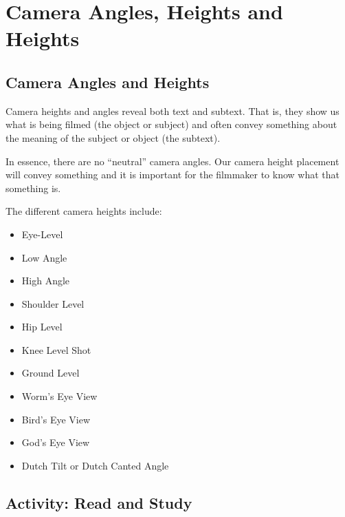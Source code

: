 \documentclass[
]{book}
\providecommand{\tightlist}{%
  \setlength{\itemsep}{0pt}\setlength{\parskip}{0pt}}
\begin{document}
\hypertarget{camera-angles-heights-and-heights}{%
\section{Camera Angles, Heights and Heights}\label{camera-angles-heights-and-heights}}

\hypertarget{camera-angles-and-heights}{%
\subsection*{Camera Angles and Heights}\label{camera-angles-and-heights}}

Camera heights and angles reveal both text and subtext. That is, they show us what is being filmed (the object or subject) and often convey something about the meaning of the subject or object (the subtext).

In essence, there are no ``neutral'' camera angles. Our camera height placement will convey something and it is important for the filmmaker to know what that something is.

The different camera heights include:

\begin{itemize}
\tightlist
\item
  Eye-Level\\
\item
  Low Angle\\
\item
  High Angle\\
\item
  Shoulder Level\\
\item
  Hip Level\\
\item
  Knee Level Shot\\
\item
  Ground Level\\
\item
  Worm's Eye View\\
\item
  Bird's Eye View\\
\item
  God's Eye View\\
\item
  Dutch Tilt or Dutch Canted Angle
\end{itemize}

\hypertarget{activity-read-and-study-1}{%
\subsection*{Activity: Read and Study}\label{activity-read-and-study-1}}
\end{document}
